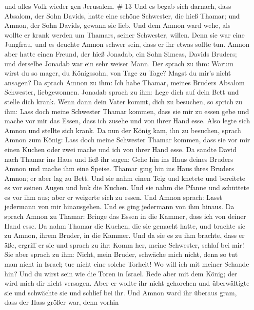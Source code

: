 und alles Volk wieder gen Jerusalem. \# 13  Und es begab
sich darnach, dass Absalom, der Sohn Davids, hatte eine schöne
Schwester, die hieß Thamar; und Amnon, der Sohn Davids, gewann sie lieb.
 Und dem Amnon ward wehe, als wollte er krank werden um
Thamars, seiner Schwester, willen. Denn sie war eine Jungfrau, und es
deuchte Amnon schwer sein, dass er ihr etwas sollte tun. 
Amnon aber hatte einen Freund, der hieß Jonadab, ein Sohn Simeas, Davids
Bruders; und derselbe Jonadab war ein sehr weiser Mann.  Der
sprach zu ihm: Warum wirst du so mager, du Königssohn, von Tage zu Tage?
Magst du mir's nicht ansagen? Da sprach Amnon zu ihm: Ich habe Thamar,
meines Bruders Absalom Schwester, liebgewonnen.  Jonadab
sprach zu ihm: Lege dich auf dein Bett und stelle dich krank. Wenn dann
dein Vater kommt, dich zu besuchen, so sprich zu ihm: Lass doch meine
Schwester Thamar kommen, dass sie mir zu essen gebe und mache vor mir
das Essen, dass ich zusehe und von ihrer Hand esse.  Also
legte sich Amnon und stellte sich krank. Da nun der König kam, ihn zu
besuchen, sprach Amnon zum König: Lass doch meine Schwester Thamar
kommen, dass sie vor mir einen Kuchen oder zwei mache und ich von ihrer
Hand esse.  Da sandte David nach Thamar ins Haus und ließ
ihr sagen: Gehe hin ins Haus deines Bruders Amnon und mache ihm eine
Speise.  Thamar ging hin ins Haus ihres Bruders Amnon; er
aber lag zu Bett. Und sie nahm einen Teig und knetete und bereitete es
vor seinen Augen und buk die Kuchen.  Und sie nahm die
Pfanne und schüttete es vor ihm aus; aber er weigerte sich zu essen. Und
Amnon sprach: Lasst jedermann von mir hinausgehen. Und es ging jedermann
von ihm hinaus.  Da sprach Amnon zu Thamar: Bringe das
Essen in die Kammer, dass ich von deiner Hand esse. Da nahm Thamar die
Kuchen, die sie gemacht hatte, und brachte sie zu Amnon, ihrem Bruder,
in die Kammer.  Und da sie es zu ihm brachte, dass er äße,
ergriff er sie und sprach zu ihr: Komm her, meine Schwester, schlaf bei
mir!  Sie aber sprach zu ihm: Nicht, mein Bruder, schwäche
mich nicht, denn so tut man nicht in Israel; tue nicht eine solche
Torheit!  Wo will ich mit meiner Schande hin? Und du wirst
sein wie die Toren in Israel. Rede aber mit dem König; der wird mich dir
nicht versagen.  Aber er wollte ihr nicht gehorchen und
überwältigte sie und schwächte sie und schlief bei ihr. 
Und Amnon ward ihr überaus gram, dass der Hass größer war, denn vorhin
